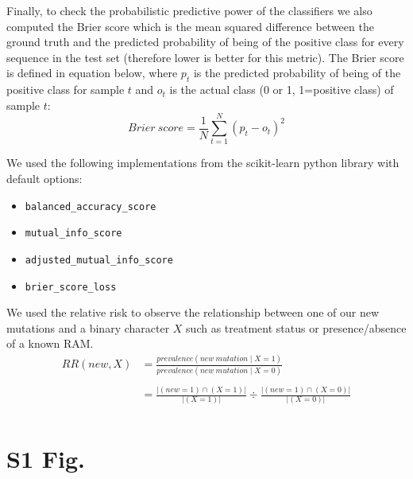 \documentclass[
  11pt,
  twoside,
  BCOR=10mm,
  listof=totoc]{scrbook}
\providecommand{\tightlist}{%
  \setlength{\itemsep}{0pt}\setlength{\parskip}{0pt}}
\begin{document}
Finally, to check the probabilistic predictive power of the classifiers we also computed the Brier score which is the mean squared difference between the ground truth and the predicted probability of being of the positive class for every sequence in the test set (therefore lower is better for this metric). The Brier score is defined in equation below, where \(p_t\) is the predicted probability of being of the positive class for sample \(t\) and \(o_t\) is the actual class (0 or 1, 1=positive class) of sample \(t\):\\
\[Brier~score=\frac{1}{N}\sum_{t=1}^N(p_t-o_t)^2\]

We used the following implementations from the scikit-learn python library \autocite{pedregosaScikitlearnMachineLearning2011} with default options:

\begin{itemize}
\tightlist
\item
  \texttt{balanced\_accuracy\_score}
\item
  \texttt{mutual\_info\_score}
\item
  \texttt{adjusted\_mutual\_info\_score}
\item
  \texttt{brier\_score\_loss}
\end{itemize}

We used the relative risk to observe the relationship between one of our new mutations and a binary character \(X\) such as treatment status or presence/absence of a known RAM. \[
\begin{aligned}
  RR(new, X) &= \frac{prevalence\left(new~mutation\mid X=1\right)}{prevalence\left(new~mutation\mid X=0\right)} \nonumber\\
  \nonumber\\
  &= \frac{|(new=1)\cap(X=1)|}{|(X=1)|}\div\frac{|(new=1)\cap(X=0)|}{|(X=0)|} \\
  \end{aligned}
\] \newpage

\hypertarget{s1-fig.}{%
\section{S1 Fig.}\label{s1-fig.}}
\end{document}

